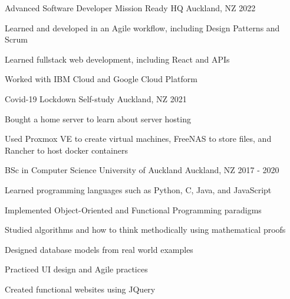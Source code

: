 

\begin{cventries}

  \cventry
    {Advanced Software Developer}
    {Mission Ready HQ}
    {Auckland, NZ}
    {2022}
    {
      \begin{cvitems}
        \item {Learned and developed in an Agile workflow, including Design Patterns and Scrum}
        \item {Learned fullstack web development, including React and APIs}
        \item {Worked with IBM Cloud and Google Cloud Platform}
      \end{cvitems}
    }

  \cventry
    {Covid-19 Lockdown}
    {Self-study}
    {Auckland, NZ}
    {2021}
    {
      \begin{cvitems}
        \item {Bought a home server to learn about server hosting}
        \item {Used Proxmox VE to create virtual machines, FreeNAS to store files, and Rancher to host docker containers}
      \end{cvitems}
    }

  \cventry
    {BSc in Computer Science} %
    {University of Auckland} %
    {Auckland, NZ} %
    {2017 - 2020} %
    {
      \begin{cvitems} %
        \item {Learned programming languages such as Python, C, Java, and JavaScript} 
        \item {Implemented Object-Oriented and Functional Programming paradigms}
        \item {Studied algorithms and how to think methodically using mathematical proofs}
        \item {Designed database models from real world examples}
        \item {Practiced UI design and Agile practices}
        \item {Created functional websites using JQuery}
      \end{cvitems}
    }

\end{cventries}
